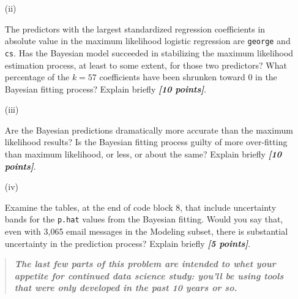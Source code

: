 \documentclass[12pt]{article}
\newcommand{\bi}[1]{\textbf{\textit{#1}}}
\begin{document}
\begin{itemize}
\begin{itemize}
\item[(ii)]

The predictors with the largest standardized regression coefficients in absolute value in the maximum likelihood logistic regression are \texttt{george} and \texttt{cs}. Has the Bayesian model succeeded in stabilizing the maximum likelihood estimation process, at least to some extent, for those two predictors? What percentage of the $k = 57$ coefficients have been shrunken toward 0 in the Bayesian fitting process? Explain briefly \bi{[10 points]}.

\item[(iii)]

Are the Bayesian predictions dramatically more accurate than the maximum likelihood results? Is the Bayesian fitting process guilty of more over-fitting than maximum likelihood, or less, or about the same? Explain briefly \bi{[10 points]}.

\item[(iv)]

Examine the tables, at the end of code block 8, that include uncertainty bands for the \texttt{p.hat} values from the Bayesian fitting. Would you say that, even with 3,065 email messages in the \textsf{Modeling} subset, there is substantial uncertainty in the prediction process? Explain briefly \bi{[5 points]}.

\end{itemize}

\end{itemize}

\begin{quote}

\bi{The last few parts of this problem are intended to whet your appetite for continued data science study: you'll be using tools that were only developed in the past 10 years or so.}

\end{quote}
\end{document}
